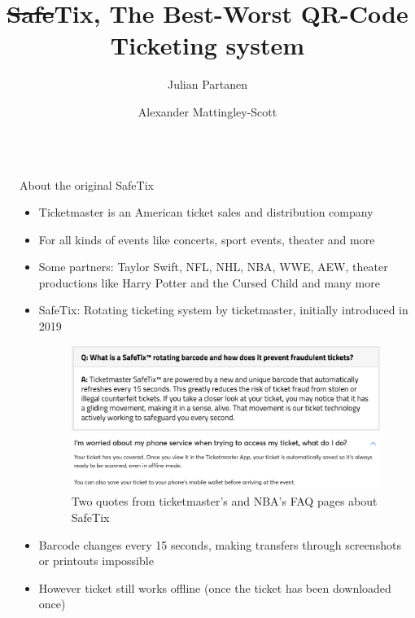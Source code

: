 \documentclass[final,dvipsnames]{beamer}
\title{\sout{Safe}Tix, The Best-Worst QR-Code Ticketing system}
\author{ Julian Partanen \inst{1} \and Alexander Mattingley-Scott \inst{1}}
\institute[shortinst]{\inst{1} Heidelberg University}
\newlength{\sepwidth}
\newlength{\colwidth}
\newcommand{\separatorcolumn}{\begin{column}{\sepwidth}\end{column}}
\begin{document}
\begin{frame}[t, fragile]
\begin{columns}[t]
\separatorcolumn

\begin{column}{\colwidth}

    \begin{block}{About the original SafeTix}
        \begin{itemize}
            \item Ticketmaster is an American ticket sales and distribution company \cite{ticketmaster_wikipedia}
            \item For all kinds of events like concerts, sport events, theater and more \cite{ticketmaster_wikipedia}
            \item Some partners: Taylor Swift, NFL, NHL, NBA, WWE, AEW, theater productions like Harry Potter and the Cursed Child and many more \cite{ticketmaster_wikipedia}
            \item SafeTix: Rotating ticketing system by ticketmaster, initially introduced in 2019 \cite{introducing_safetix} \cite{ticketmaster_safetix_faq} \cite{nba_safetix_faq}
            \begin{figure}[h]
                \begin{center}
                    \includegraphics[width=\textwidth]{figures/SafeTix_Quote_1.png}
                \end{center}
                \begin{center}
                    \includegraphics[width=\textwidth]{figures/SafeTix_Quote_2.png}
                \end{center}
                \caption{Two quotes from ticketmaster's and NBA's FAQ pages about SafeTix \cite{ticketmaster_safetix_faq} \cite{nba_safetix_faq}}
                \label{fig:safetix_quotes}
            \end{figure}
            \item Barcode changes every 15 seconds, making transfers through screenshots or printouts impossible \cite{nba_safetix_faq}
            \item However ticket still works offline (once the ticket has been downloaded once) \cite{ticketmaster_safetix_faq}
        \end{itemize}


\end{block}
\end{column}
\end{columns}
\end{frame}
\end{document}

